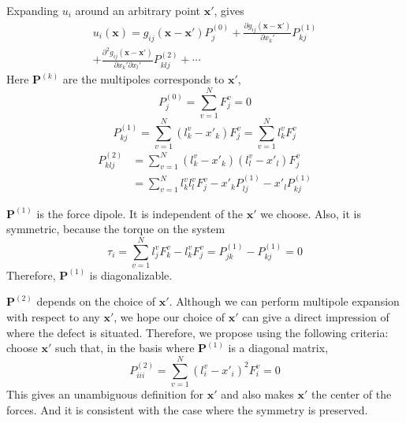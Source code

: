 \documentclass[%
 reprint,
 amsmath,amssymb,
 aps,
]{revtex4-1}
\begin{document}
Expanding $u_i$ around an arbitrary point $\bm{x'}$, gives
\begin{multline}
u_i(\bm{x})
= g_{ij}(\bm{x}-\bm{x'}) P_j^{(0)}
 + \frac{\partial g_{ij}(\bm{x}-\bm{x'})}{\partial x_k'} P_{kj}^{(1)}\\
 + \frac{\partial^2 g_{ij}(\bm{x}-\bm{x'})}{\partial x_k' \partial x_l'} P_{klj}^{(2)}
 + \cdots
\end{multline}
Here $\bm{P}^{(k)}$ are the multipoles corresponds to $\bm{x'}$,
\begin{equation}
  P_j^{(0)} = \sum_{v=1}^N F_j^v = 0
\end{equation}
\begin{equation}
  P_{kj}^{(1)} = \sum_{v=1}^N (l_k^v-x'_k) F_j^v = \sum_{v=1}^N l_k^v F_j^v
\end{equation}
\begin{align}
  P_{klj}^{(2)} & = \sum_{v=1}^N (l_k^v-x'_k) (l_l^v-x'_l) F_j^v \nonumber \\
  & = \sum_{v=1}^N l_k^vl_l^v F_j^v - x'_k P_{lj}^{(1)} - x'_l P_{kj}^{(1)}
\end{align}

$\bm{P}^{(1)}$ is the force dipole.
It is independent of the $\bm{x'}$ we choose.
Also, it is symmetric, because the torque on the system
\begin{equation}
  \tau_i = \sum_{v=1}^N l_j^v F_k^v - l_k^v F_j^v = P_{jk}^{(1)} - P_{kj}^{(1)} = 0
\end{equation}
Therefore, $\bm{P}^{(1)}$ is diagonalizable.

$\bm{P}^{(2)}$ depends on the choice of $\bm{x'}$.
Although we can perform multipole expansion with respect to any $\bm{x'}$, we hope our choice of $\bm{x'}$ can give a direct impression of where the defect is situated.
Therefore, we propose using the following criteria:
choose $\bm{x'}$ such that, in the basis where $\bm{P}^{(1)}$ is a diagonal matrix,
\begin{equation}
  P_{iii}^{(2)} = \sum_{v=1}^N (l_i^v-x'_i)^2 F_i^v = 0
\end{equation}
This gives an unambiguous definition for $\bm{x'}$ and also makes $\bm{x'}$ the center of the forces.
And it is consistent with the case where the symmetry is preserved.

%
\end{document}
